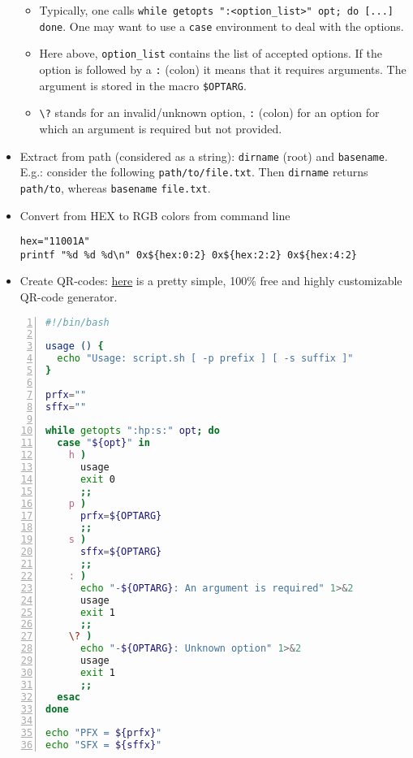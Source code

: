 \documentclass[a4paper,12pt,%
              final%
              ]{article}
\begin{document}
\begin{itemize}
    \begin{itemize}
      \item Typically, one calls \verb|while getopts ":<option_list>" opt; do [...] done|. One may want to use a \verb|case| environment to deal with the options.
      \item Here above, \verb|option_list| contains the list of accepted options. If the option is followed by a \verb|:| (colon) it means that it requires arguments. The argument is stored in the macro \verb|$OPTARG|.
      \item \verb|\?| stands for an invalid/unknown option, \verb|:| (colon) for an option for which an argument is required but not provided.
    \end{itemize}
  \item Extract from path (considered as a string): \texttt{dirname} (root) and \texttt{basename}. E.g.: consider the following \texttt{path/to/file.txt}. Then \texttt{dirname} returns \texttt{path/to}, whereas \texttt{basename} \texttt{file.txt}.
  \item Convert from HEX to RGB colors from command line
\begin{verbatim}
hex="11001A"
printf "%d %d %d\n" 0x${hex:0:2} 0x${hex:2:2} 0x${hex:4:2}
\end{verbatim}
  \item Create QR-codes: \href{https://www.qrcode-monkey.com/}{here} is a pretty simple, 100\% free and highly customizable QR-code generator.
\end{itemize}

\begin{lstlisting}[language=bash,numbers=left,float,frame=single,caption={script.sh, an example for \texttt{getopts}},label={lst:getopt_ex},numberfirstline=true,stepnumber=5,firstnumber=1]
#!/bin/bash

usage () {
  echo "Usage: script.sh [ -p prefix ] [ -s suffix ]"
}

prfx=""
sffx=""

while getopts ":hp:s:" opt; do
  case "${opt}" in
    h )
      usage
      exit 0
      ;;
    p )
      prfx=${OPTARG}
      ;;
    s )
      sffx=${OPTARG}
      ;;
    : )
      echo "-${OPTARG}: An argument is required" 1>&2
      usage
      exit 1
      ;;
    \? )
      echo "-${OPTARG}: Unknown option" 1>&2
      usage
      exit 1
      ;;
  esac
done

echo "PFX = ${prfx}"
echo "SFX = ${sffx}"
\end{lstlisting}
\end{document}
